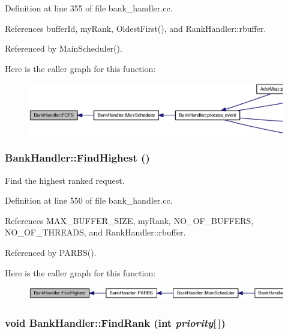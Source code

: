 Definition at line 355 of file bank\_\-handler.cc.

References bufferId, myRank, OldestFirst(), and RankHandler::rbuffer.

Referenced by MainScheduler().

Here is the caller graph for this function:\nopagebreak
\begin{figure}[H]
\begin{center}
\leavevmode
\includegraphics[width=420pt]{classBankHandler_9fa196596e22b045d4dc68a20f9a9da3_icgraph}
\end{center}
\end{figure}
\subsubsection[{FindHighest}]{ BankHandler::FindHighest ()}\label{classBankHandler_37259129fb6791f471c9113c4ddabaee}


Find the highest ranked request. 



Definition at line 550 of file bank\_\-handler.cc.

References MAX\_\-BUFFER\_\-SIZE, myRank, NO\_\-OF\_\-BUFFERS, NO\_\-OF\_\-THREADS, and RankHandler::rbuffer.

Referenced by PARBS().

Here is the caller graph for this function:\nopagebreak
\begin{figure}[H]
\begin{center}
\leavevmode
\includegraphics[width=420pt]{classBankHandler_37259129fb6791f471c9113c4ddabaee_icgraph}
\end{center}
\end{figure}
\subsubsection[{FindRank}]{\setlength{\rightskip}{0pt plus 5cm}void BankHandler::FindRank (int {\em priority}[$\,$])}\label{classBankHandler_4ce7b9b8cf98eb415bd944e3a3c2f388}


